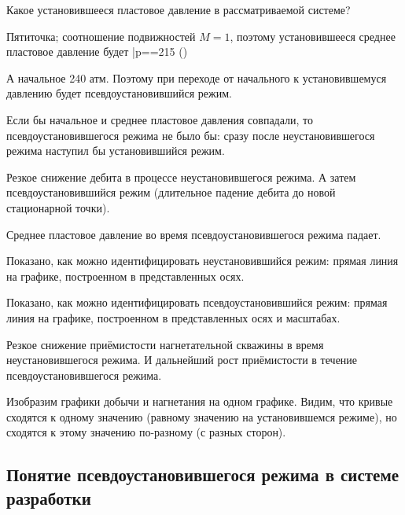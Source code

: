 \documentclass[main.tex]{subfiles}
\begin{document}

Какое установившееся пластовое давление в рассматриваемой системе?

Пятиточка; соотношение подвижностей $M=1$, поэтому установившееся среднее пластовое давление будет
\beq
\bar{p}==215 ()
\eeq

А начальное 240 атм. Поэтому при переходе от начального к установившемуся давлению будет псевдоустановившийся режим.

Если бы начальное и среднее пластовое давления совпадали, то псевдоустановившегося режима не было бы: сразу после неустановившегося режима наступил бы установившийся режим.


Резкое снижение дебита в процессе неустановившегося режима. А затем псевдоустановившийся режим (длительное падение дебита до новой стационарной точки). 


Среднее пластовое давление во время псевдоустановившегося режима падает.


Показано, как можно идентифицировать неустановившийся режим: прямая линия  на графике, построенном в представленных осях.


Показано, как можно идентифицировать псевдоустановившийся режим: прямая линия  на графике, построенном в представленных осях и масштабах.


Резкое снижение приёмистости нагнетательной скважины в время неустановившегося режима. И дальнейший рост приёмистости в течение псевдоустановившегося режима. 


Изобразим графики добычи и нагнетания на одном графике. Видим, что кривые сходятся к одному значению (равному значению на установившемся режиме), но сходятся к этому значению по-разному (с разных сторон).

\subsection{Понятие псевдоустановившегося режима в системе разработки}
\end{document}
